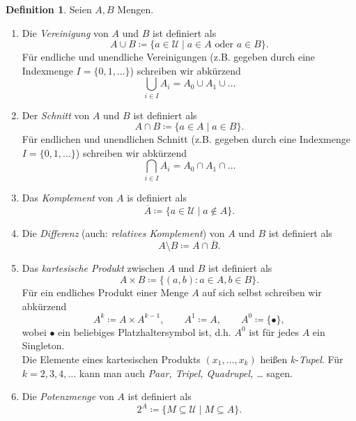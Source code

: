\documentclass[11pt, a4paper]{article}
\theoremstyle{definition}
\newtheorem{definition}{Definition}[section]
\theoremstyle{plain}
\numberwithin{equation}{section}
\newcommand{\comp}[1]{\overline{#1}}
\begin{document}
\begin{definition}\label{def:setops}
	Seien \( A, B \) Mengen. 
	\begin{enumerate}[label=(\alph*)]
		\item Die \textit{Vereinigung} von \( A \) und \( B \) ist definiert als 
			\[ 
				A \cup B \coloneqq \{ a \in \mathcal{U} \mid a \in A \text{ oder } a \in B \}.
			\]
			Für endliche und unendliche Vereinigungen (z.B. gegeben durch eine Indexmenge \( I = \{ 0, 1, \ldots \} \)) schreiben wir abkürzend
			\[
				\bigcup_{i \in I} A_i = A_0 \cup A_1 \cup \ldots
			\]
		\item Der \textit{Schnitt} von \( A \) und \( B \) ist definiert als
			\[
				A \cap B \coloneqq \{ a \in A \mid a \in B \}.
			\]
			Für endlichen und unendlichen Schnitt (z.B. gegeben durch eine Indexmenge \( I = \{ 0, 1, \ldots \} \)) schreiben wir abkürzend
			\[
				\bigcap_{i \in I} A_i = A_0 \cap A_1 \cap \ldots
			\]
		\item Das \textit{Komplement} von \( A \) is definiert als
			\[
				\comp{A} \coloneqq \{ a \in \mathcal{U} \mid a \notin A \}.
			\]
		\item Die \textit{Differenz} (auch: \textit{relatives Komplement}) von \( A \) und \( B \) ist definiert als
			\[
				A \setminus B \coloneqq A \cap \comp{B}.
			\]
		\item Das \textit{kartesische Produkt} zwischen \( A \) und \( B \) ist definiert als
			\[
				A \times B \coloneqq \{(a, b) : a \in A, b \in B \}.
			\]
			Für ein endliches Produkt einer Menge \( A \) auf sich selbst schreiben wir abkürzend
			\[
				A^k \coloneqq A \times A^{k-1}, \quad\quad A^1 \coloneqq A, \quad\quad A^0 \coloneqq \{ \bullet \},
			\]
			wobei \( \bullet \) ein beliebiges Platzhaltersymbol ist, d.h. \( A^0 \) ist für jedes \( A \) ein Singleton.\\
			Die Elemente eines kartesischen Produkts \( (x_1, \ldots, x_k) \) heißen \( k\)-\textit{Tupel}. Für \( k = 2, 3, 4, \ldots \) kann man auch \textit{Paar, Tripel, Quadrupel, \ldots} sagen.
		\item Die \textit{Potenzmenge} von \( A \) ist definiert als
			\[
				2^A \coloneqq \{ M \subseteq \mathcal{U} \mid M \subseteq A \}.
			\]
	\end{enumerate}
\end{definition}
\end{document}
